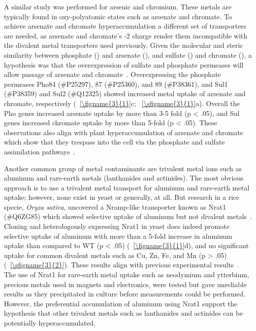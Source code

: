 \documentclass[../main/main]{subfiles}
\begin{document}
A similar study was performed for arsenic and chromium. These metals are typically found in oxy-polyatomic states such as arsenate and chromate. To achieve arsenate and chromate hyperaccumulation a different set of transporters are needed, as arsenate and chromate's -2 charge render them incompatible with the divalent metal transporters used previously. Given the molecular and steric similarity between phosphate () and arsenate (), and sulfate () and chromate (), a hypothesis was that the overexpression of sulfate and phosphate permeases will allow passage of arsenate and chromate~\cite{catarecha2007,pereira2008}. Overexpressing the phosphate permeases Pho84 (\#{}P25297), 87 (\#{}P25360), and 89 (\#{}P38361), and Sul1 (\#{}P38359) and Sul2 (\#{}Q12325) showed increased metal uptake of arsenate and chromate, respectively (\FIGURE~\ref{\figname{3}{1}}c; \sFIGURE~\ref{\sfigname{3}{1}}a). Overall the Pho genes increased arsenate uptake by more than 3-5 fold (p < .05), and Sul genes increased chromate uptake by more than 5-fold (p < .05).
These observations also align with plant hyperaccumulation of arsenate and chromate which show that they trespass into the cell via the phosphate and sulfate assimilation pathways~\cite{zhao2009,shanker2005}.

Another common group of metal contaminants are trivalent metal ions such as aluminum and rare-earth metals (lanthanides and actinides). The most obvious approach is to use a trivalent metal transport for aluminum and rare-earth metal uptake; however, none exist in yeast or generally, at all. But research in a rice specie, \textit{Oryza sativa}, uncovered a Nramp-like transporter known as Nrat1 (\#{}Q6ZG85) which showed selective uptake of aluminum but not divalent metals~\cite{xia2010}. Cloning and heterologously expressing Nrat1 in yeast does indeed promote selective uptake of aluminum with more than a 5-fold increase in aluminum uptake than compared to WT (p < .05) (\FIGURE~\ref{\figname{3}{1}}d), and no significant uptake for common divalent metals such as Cu, Zn, Fe, and Mn (p > .05) (\sFIGURE~\ref{\sfigname{3}{2}}). These results align with previous experimental results~\cite{xia2010}. The use of Nrat1 for rare-earth metal uptake such as neodymium and ytterbium, precious metals used in magnets and electronics, were tested but gave unreliable results as they precipitated in culture before measurements could be performed. However, the preferential accumulation of aluminum using Nrat1 support the hypothesis that other trivalent metals such as lanthanides and actinides can be potentially hyperaccumulated.
\clearpage %
\end{document}
